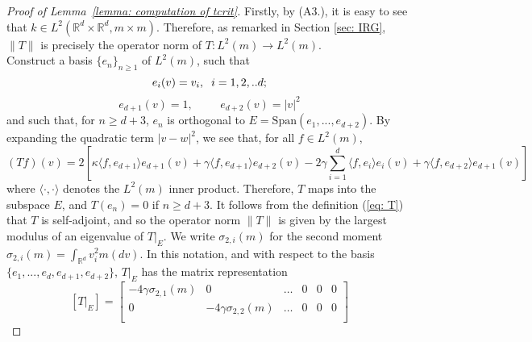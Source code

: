 \begin{proof}[Proof of Lemma~\ref{lemma: computation of tcrit}]
Firstly, by (A3.), it is easy to see that $k\in L^2(\mathbb{R}^d\times \mathbb{R}^d,m\times m)$. Therefore, as remarked in Section \ref{sec: IRG}, $\|T\|$ is precisely the operator norm of $T: L^2(m)\rightarrow L^2(m)$. \medskip \\ Construct a basis $\{e_n\}_{n\geq 1}$ of $L^2(m)$, such that \begin{equation}
       e_i(v)=v_i, \hspace{0.2cm}i=1,2,..d;
   \end{equation}
   \begin{equation}
       e_{d+1}(v)=1, \hspace{1cm}e_{d+2}(v)=|v|^2
   \end{equation} and such that, for $n\geq d+3$, $e_n$ is orthogonal to $E=\text{Span}(e_1,...,e_{d+2})$.
   By expanding the quadratic term $|v-w|^2$, we see that, for all $f\in L^2(m),$ \begin{equation} 
       (Tf)(v)  =2\left[\kappa\langle f, e_{d+1}\rangle e_{d+1}(v)
       +\gamma \langle f, e_{d+1}\rangle e_{d+2}(v)
       -2\gamma \sum_{i=1}^d \langle f, e_i\rangle e_i(v)
       +\gamma \langle f, e_{d+2}\rangle e_{d+1}(v)\right]
   \end{equation} 
 where $\langle\cdot,\cdot\rangle$ denotes the $L^2(m)$ inner product. Therefore, $T$ maps into the subspace $E$, and $T(e_n)=0$ if $n\geq d+3.$ It follows from the definition (\ref{eq: T}) that $T$ is self-adjoint, and so the operator norm $\|T\|$ is given by the largest modulus of an eigenvalue of $T|_E.$ We write $\sigma_{2,i}(m)$ for the second moment $\sigma_{2,i}(m)=\int_{\mathbb{R}^d} v_i^2 m(dv)$. In this notation, and with respect to the basis $\{e_1,...,e_d, e_{d+1}, e_{d+2}\}$,  $T|_E$ has the matrix representation  \begin{equation}
       \left[T|_E\right]=\begin{bmatrix}
    -4\gamma\sigma_{2,1}(m) & 0  & \dots  &0 & 0 &0 \\
    0&-4\gamma\sigma_{2,2}(m)   & \dots  &0 & 0 &0 \\
    

\end{bmatrix}
\end{equation}
\end{proof}
